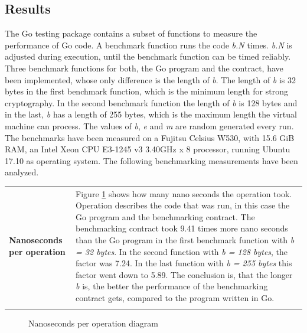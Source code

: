 \subsection{Results}
The Go testing package contains a subset of functions to measure the performance of Go code. A benchmark function runs the code \textit{b.N} times. \textit{b.N} is adjusted during execution, until the benchmark function can be timed reliably. \cite{golang_testing} Three benchmark functions for both, the Go program and the contract, have been implemented, whose only difference is the length of \textit{b}. The length of \textit{b} is 32 bytes in the first benchmark function, which is the minimum length for strong cryptography. In the second benchmark function the length of \textit{b} is 128 bytes and in the last, \textit{b} has a length of 255 bytes, which is the maximum length the virtual machine can process. The values of \textit{b}, \textit{e} and \textit{m} are random generated every run. The benchmarks have been measured on a Fujitsu Celsius W530, with 15.6 GiB RAM, an Intel Xeon CPU E3-1245 v3 \@ 3.40GHz x 8 processor, running Ubuntu 17.10 as operating system. The following benchmarking measurements have been analyzed.

\begin{tabular}[t]{ p{3cm} p{12.5cm}}
\raggedright
\textbf{Nanoseconds per operation} &
Figure \ref{nperop} shows how many nano seconds the operation took. Operation describes the code that was run, in this case the Go program and the benchmarking contract. The benchmarking contract took 9.41 times more nano seconds than the Go program in the first benchmark function with \textit{b = 32 bytes}. In the second function with \textit{b = 128 bytes}, the factor was 7.24. In the last function with \textit{b = 255 bytes} this factor went down to 5.89. The conclusion is, that the longer \textit{b} is, the better the performance of the benchmarking contract gets, compared to the program written in Go. \\ \\
\end{tabular}

\begin{figure}[H]
	\begin{center}
	\caption{Nanoseconds per operation diagram}
	\label{nperop}
	\end{center}
\end{figure}

